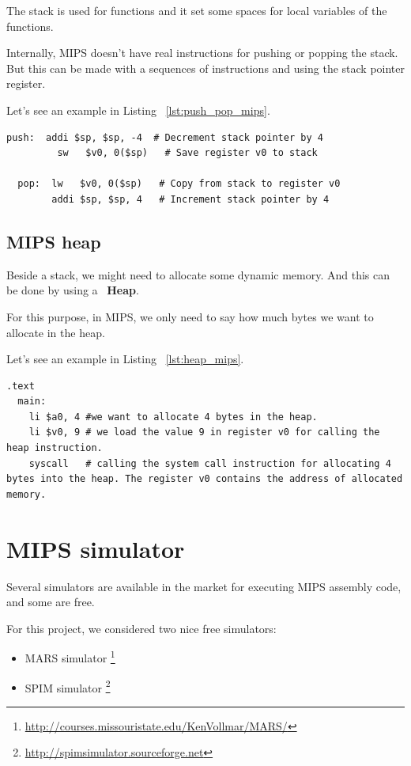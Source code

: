 \documentclass[
  oneside,
  11pt, a4paper,
  footinclude=true,
  headinclude=true,
  cleardoublepage=empty
]{scrbook}
\begin{document}
The stack is used for functions and it set some spaces for local variables of the functions.

Internally, MIPS doesn't have real instructions for pushing or popping the stack.
But this can be made with a sequences of instructions and using the stack pointer register.

Let's see an example in Listing ~\ref{lst:push_pop_mips}.

\begin{lstlisting}[caption={Example of push and pop instructions in MIPS},label={lst:push_pop_mips}]
  push:  addi $sp, $sp, -4  # Decrement stack pointer by 4
         sw   $v0, 0($sp)   # Save register v0 to stack

  pop:  lw   $v0, 0($sp)   # Copy from stack to register v0
        addi $sp, $sp, 4   # Increment stack pointer by 4
\end{lstlisting}

\subsection{MIPS heap}
Beside a stack, we might need to allocate some dynamic memory.
And this can be done by using a ~\textbf{Heap}.

For this purpose, in MIPS, we only need to say how much bytes we want to allocate in the heap.

Let's see an example in Listing ~\ref{lst:heap_mips}.

\begin{lstlisting}[caption={Example of code for allocating in the heap}, label={lst:heap_mips}]
.text 
  main:
    li $a0, 4 #we want to allocate 4 bytes in the heap.
    li $v0, 9 # we load the value 9 in register v0 for calling the heap instruction.
    syscall   # calling the system call instruction for allocating 4 bytes into the heap. The register v0 contains the address of allocated memory.
\end{lstlisting}

\section{MIPS simulator}

Several simulators are available in the market for executing MIPS assembly code, and some are free.

For this project, we considered two nice free simulators:
\begin{itemize}
\item MARS simulator \footnote{\url{http://courses.missouristate.edu/KenVollmar/MARS/}}
\item SPIM simulator \footnote{\url{http://spimsimulator.sourceforge.net}}
\end{itemize}
\end{document}
